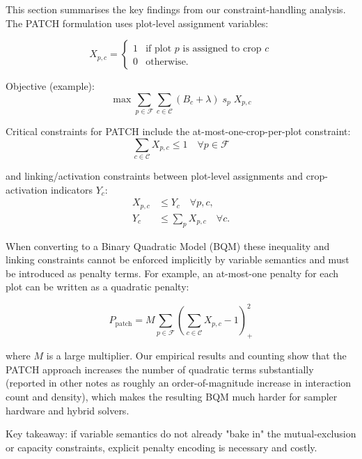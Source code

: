 \documentclass[11pt,a4paper]{article}
\begin{document}
This section summarises the key findings from our constraint-handling analysis. The PATCH formulation uses plot-level assignment variables:

\begin{equation}
X_{p,c} = \begin{cases}
1 & \text{if plot } p \text{ is assigned to crop } c \\
0 & \text{otherwise.}
\end{cases}
\end{equation}

Objective (example):
\begin{equation}
\max \sum_{p \in \mathcal{F}} \sum_{c \in \mathcal{C}} (B_c + \lambda) \; s_p \; X_{p,c}
\end{equation}

Critical constraints for PATCH include the at-most-one-crop-per-plot constraint:
\begin{equation}\label{eq:patch_one_crop}
\sum_{c \in \mathcal{C}} X_{p,c} \le 1 \quad \forall p \in \mathcal{F}
\end{equation}

and linking/activation constraints between plot-level assignments and crop-activation indicators $Y_c$:
\begin{align}
X_{p,c} &\le Y_c \quad \forall p,c,\\
Y_c &\le \sum_{p} X_{p,c} \quad \forall c.
\end{align}

When converting to a Binary Quadratic Model (BQM) these inequality and linking constraints cannot be enforced implicitly by variable semantics and must be introduced as penalty terms. For example, an at-most-one penalty for each plot can be written as a quadratic penalty:

\begin{equation}\label{eq:patch_penalty}
P_{\text{patch}} = M \sum_{p \in \mathcal{F}} \left(\sum_{c \in \mathcal{C}} X_{p,c} - 1\right)^2_+
\end{equation}

where $M$ is a large multiplier. Our empirical results and counting show that the PATCH approach increases the number of quadratic terms substantially (reported in other notes as roughly an order-of-magnitude increase in interaction count and density), which makes the resulting BQM much harder for sampler hardware and hybrid solvers.

Key takeaway: if variable semantics do not already "bake in" the mutual-exclusion or capacity constraints, explicit penalty encoding is necessary and costly.
\end{document}
